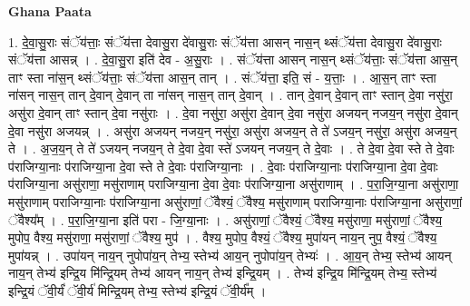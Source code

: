 \documentclass[17pt]{extarticle}
\begin{document}
\textbf{Ghana Paata } \newline

1. दे॒वा॒सु॒राः संॅय॑त्ताः॒ संॅय॑त्ता देवासु॒रा दे॑वासु॒राः संॅय॑त्ता आसन् नास॒न् थ्संॅय॑त्ता देवासु॒रा दे॑वासु॒राः संॅय॑त्ता आसन्न् । . दे॒वा॒सु॒रा इति॑ देव - अ॒सु॒राः । . संॅय॑त्ता आसन् नास॒न् थ्संॅय॑त्ताः॒ संॅय॑त्ता आस॒न् ताꣳ स्ता ना॑स॒न् थ्संॅय॑त्ताः॒ संॅय॑त्ता आस॒न् तान् । . संॅय॑त्ता॒ इति॒ सं - य॒त्ताः॒ । . आ॒स॒न् ताꣳ स्ता ना॑सन् नास॒न् तान् दे॒वान् दे॒वान् ता ना॑सन् नास॒न् तान् दे॒वान् । . तान् दे॒वान् दे॒वान् ताꣳ स्तान् दे॒वा नसु॑रा॒ असु॑रा दे॒वान् ताꣳ स्तान् दे॒वा नसु॑राः । . दे॒वा नसु॑रा॒ असु॑रा दे॒वान् दे॒वा नसु॑रा अजयन् नजय॒न् नसु॑रा दे॒वान् दे॒वा नसु॑रा अजयन्न् । . असु॑रा अजयन् नजय॒न् नसु॑रा॒ असु॑रा अजय॒न् ते ते॑ ऽजय॒न् नसु॑रा॒ असु॑रा अजय॒न् ते । . अ॒ज॒य॒न् ते ते॑ ऽजयन् नजय॒न् ते दे॒वा दे॒वा स्ते॑ ऽजयन् नजय॒न् ते दे॒वाः । . ते दे॒वा दे॒वा स्ते ते दे॒वाः प॑राजिग्या॒नाः प॑राजिग्या॒ना दे॒वा स्ते ते दे॒वाः प॑राजिग्या॒नाः । . दे॒वाः प॑राजिग्या॒नाः प॑राजिग्या॒ना दे॒वा दे॒वाः प॑राजिग्या॒ना असु॑राणा॒ मसु॑राणाम् पराजिग्या॒ना दे॒वा दे॒वाः प॑राजिग्या॒ना असु॑राणाम् । . प॒रा॒जि॒ग्या॒ना असु॑राणा॒ मसु॑राणाम् पराजिग्या॒नाः प॑राजिग्या॒ना असु॑राणां॒ ॅवैश्यं॒ ॅवैश्य॒ मसु॑राणाम् पराजिग्या॒नाः प॑राजिग्या॒ना असु॑राणां॒ ॅवैश्य᳚म् । . प॒रा॒जि॒ग्या॒ना इति॑ परा - जि॒ग्या॒नाः । . असु॑राणां॒ ॅवैश्यं॒ ॅवैश्य॒ मसु॑राणा॒ मसु॑राणां॒ ॅवैश्य॒ मुपोप॒ वैश्य॒ मसु॑राणा॒ मसु॑राणां॒ ॅवैश्य॒ मुप॑ । . वैश्य॒ मुपोप॒ वैश्यं॒ ॅवैश्य॒ मुपा॑यन् नाय॒न् नुप॒ वैश्यं॒ ॅवैश्य॒ मुपा॑यन्न् । . उपा॑यन् नाय॒न् नुपोपा॑य॒न् तेभ्य॒ स्तेभ्य॑ आय॒न् नुपोपा॑य॒न् तेभ्यः॑ । . आ॒य॒न् तेभ्य॒ स्तेभ्य॑ आयन् नाय॒न् तेभ्य॑ इन्द्रि॒य मि॑न्द्रि॒यम् तेभ्य॑ आयन् नाय॒न् तेभ्य॑ इन्द्रि॒यम् । . तेभ्य॑ इन्द्रि॒य मि॑न्द्रि॒यम् तेभ्य॒ स्तेभ्य॑ इन्द्रि॒यं ॅवी॒र्यं॑ ॅवी॒र्य॑ मिन्द्रि॒यम् तेभ्य॒ स्तेभ्य॑ इन्द्रि॒यं ॅवी॒र्य᳚म् । \newline
\end{document}
